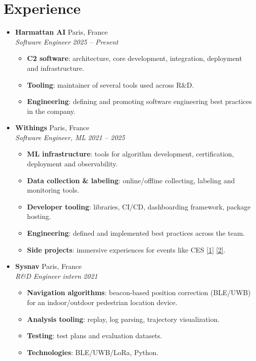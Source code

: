 \documentclass[a4paper,11pt]{article}
\newcommand{\entry}[4]{%
\item \textbf{#1} \hfill #2 \\
\textit{\small #3} \hfill \textit{\small #4}}
\newenvironment{entries}{
\begin{itemize}[leftmargin=1.2em, itemsep=4pt, parsep=0pt, topsep=0pt]}{
\end{itemize}}
\newenvironment{details}{
\begin{itemize}[label=$\circ$, leftmargin=1.5em, itemsep=0pt, parsep=0pt, topsep=2pt]\small}{
\end{itemize}}
\begin{document}
\section{Experience}
\begin{entries}
  \entry{Harmattan AI}{Paris, France}{Software Engineer}{2025 -- Present}
  \begin{details}
  \item \textbf{C2 software}: architecture, core development, integration, deployment and
    infrastructure.
  \item \textbf{Tooling}: maintainer of several tools used across R\&D.
  \item \textbf{Engineering}: defining and promoting software engineering best practices
    in the company.
  \end{details}

  \entry{Withings}{Paris, France}{Software Engineer, ML}{2021 -- 2025}
  \begin{details}
  \item \textbf{ML infrastructure}: tools for algorithm development, certification,
    deployment and observability.
  \item \textbf{Data collection \& labeling}: online/offline collecting, labeling and
    monitoring tools.
  \item \textbf{Developer tooling}: libraries, CI/CD, dashboarding framework, package hosting.
  \item \textbf{Engineering}: defined and implemented best practices across the team.
  \item \textbf{Side projects}: immersive experiences for events like CES
    {\footnotesize\href{https://www.athem.fr/en/projects/l-art-de-vivre-mieux-withings}{[1]}
    \href{https://www.instagram.com/p/C17NvkmIJ_H}{[2]}}.
  \end{details}

  \entry{Sysnav}{Paris, France}{R\&D Engineer intern}{2021}
  \begin{details}
  \item \textbf{Navigation algorithms}: beacon-based position correction (BLE/UWB) for an
    indoor/outdoor pedestrian location device.
  \item \textbf{Analysis tooling}: replay, log parsing, trajectory visualization.
  \item \textbf{Testing}: test plans and evaluation datasets.
  \item \textbf{Technologies}: BLE/UWB/LoRa, Python.
  \end{details}


\end{entries}
\end{document}
